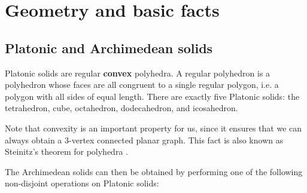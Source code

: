 \chapter{Geometry and basic facts}

\section{Platonic and Archimedean solids}

Platonic solids are regular \textbf{convex} polyhedra. A regular polyhedron is a polyhedron whose faces are all congruent to a single regular polygon, i.e. a polygon with all sides of equal length. There are exactly five Platonic solids: the tetrahedron, cube, octahedron, dodecahedron, and icosahedron.

Note that convexity is an important property for us, since it ensures that we can always obtain a 3-vertex connected planar graph. This fact is also known as Steinitz’s theorem for polyhedra \cite{kendall24}.

The Archimedean solids can then be obtained by performing one of the following non-disjoint operations on Platonic solids:


